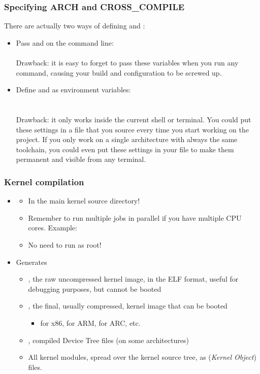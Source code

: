 \begin{frame}
  \frametitle{Specifying ARCH and CROSS\_COMPILE}
  There are actually two ways of defining  and :
  \begin{itemize}
  \item Pass  and  on the 
    command line: \\
     \\
    Drawback: it is easy to forget to pass these variables when
    you run any  command, causing your build and
    configuration to be screwed up.
  \item Define  and  as environment
    variables: \\
     \\
     \\
    Drawback: it only works inside the current
    shell or terminal. You could put these settings in a file
    that you source every time you start working on the project.
    If you only work on a single architecture with always the
    same toolchain, you could even put these settings in your
     file to make them permanent and visible from
    any terminal.
  \end{itemize}
\end{frame}

\begin{frame}
  \frametitle{Kernel compilation}
  \begin{itemize}
  \item {}
    \begin{itemize}
    \item In the main kernel source directory!
    \item Remember to run multiple jobs in parallel
          if you have multiple CPU cores. Example: 
    \item No need to run as root!
    \end{itemize}
  \item Generates
    \begin{itemize}
    \item {}, the raw uncompressed kernel image, in the
      ELF format, useful for debugging purposes, but cannot be booted
    \item {}, the final, usually
      compressed, kernel image that can be booted
      \begin{itemize}
      \item {} for x86,  for ARM,
       for ARC, etc.
      \end{itemize}
    \item {}, compiled Device Tree
      files (on some architectures)
    \item All kernel modules, spread over the kernel source tree, as
       ({\em Kernel Object}) files.
    \end{itemize}
  \end{itemize}
\end{frame}

